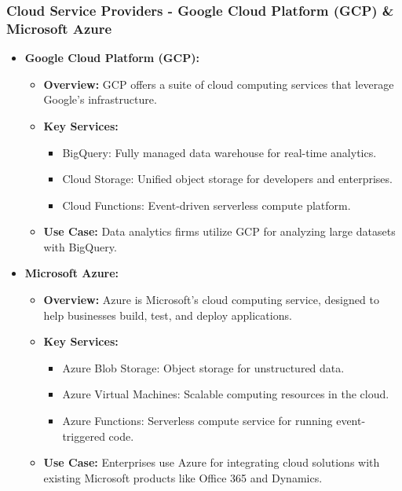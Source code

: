 \documentclass{beamer}
\begin{document}
\begin{frame}[fragile]
    \frametitle{Cloud Service Providers - Google Cloud Platform (GCP) & Microsoft Azure}
    \begin{itemize}
        \item \textbf{Google Cloud Platform (GCP):}
        \begin{itemize}
            \item \textbf{Overview:} GCP offers a suite of cloud computing services that leverage Google's infrastructure.
            \item \textbf{Key Services:}
            \begin{itemize}
                \item BigQuery: Fully managed data warehouse for real-time analytics.
                \item Cloud Storage: Unified object storage for developers and enterprises.
                \item Cloud Functions: Event-driven serverless compute platform.
            \end{itemize}
            \item \textbf{Use Case:} Data analytics firms utilize GCP for analyzing large datasets with BigQuery.
        \end{itemize}
    \end{itemize}
    
    \begin{itemize}
        \item \textbf{Microsoft Azure:}
        \begin{itemize}
            \item \textbf{Overview:} Azure is Microsoft's cloud computing service, designed to help businesses build, test, and deploy applications.
            \item \textbf{Key Services:}
            \begin{itemize}
                \item Azure Blob Storage: Object storage for unstructured data.
                \item Azure Virtual Machines: Scalable computing resources in the cloud.
                \item Azure Functions: Serverless compute service for running event-triggered code.
            \end{itemize}
            \item \textbf{Use Case:} Enterprises use Azure for integrating cloud solutions with existing Microsoft products like Office 365 and Dynamics.
        \end{itemize}
    \end{itemize}
\end{frame}
\end{document}
